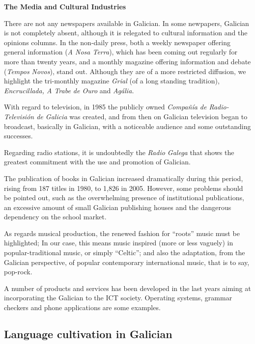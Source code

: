 \begin{multicols}{2}
\begin{itemize}
\begin{multicols}{2}
\textbf{The Media and Cultural Industries}

There are not any newspapers available in Galician. In some newpapers, Galician is not completely absent, although it is relegated to cultural information and the opinions columns. In the non-daily press, both a weekly newspaper offering general information (\textit{A Nosa Terra}), which has been coming out regularly for more than twenty years, and a monthly magazine offering information and debate (\textit{Tempos Novos}), stand out. Although they are of a more restricted diffusion, we highlight the tri-monthly magazine \textit{Grial} (of a long standing tradition), \textit{Encrucillada, A Trabe de Ouro} and \textit{Agália.} 

With regard to television, in 1985 the publicly owned \textit{Compañía de Radio-Televisión de Galicia} was created, and from then on Galician television began to broadcast, basically in Galician, with a noticeable audience and some outstanding successes. 

Regarding radio stations, it is undoubtedly the \textit{Radio Galega} that shows the greatest commitment with the use and promotion of Galician. 

The publication of books in Galician increased dramatically during this period, rising from 187 titles in 1980, to 1,826 in 2005. However, some problems should be pointed out, such as the overwhelming presence of institutional publications, an excessive amount of small Galician publishing houses and the dangerous dependency on the school market. 

As regards musical production, the renewed fashion for “roots” music must be highlighted; In our case, this means music inspired (more or less vaguely) in popular-traditional music, or simply “Celtic”; and also the adaptation, from the Galician perspective, of popular contemporary international music, that is to say, pop-rock.

A number of products and services has been developed in the last years aiming at incorporating the Galician to the ICT society. Operating systems, grammar checkers and phone applications are some examples\cite{GAL-Nota10}.

\subsection{Language cultivation in Galician}


\end{multicols}
\end{itemize}
\end{multicols}
